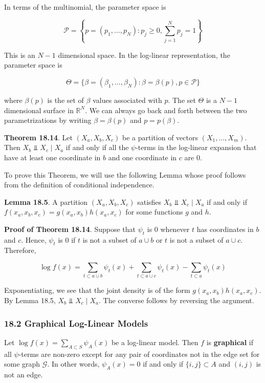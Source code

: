 In terms of the multinomial, the parameter space is

\[ \mathcal{P} = \left\{ p = (p_1, \dots, p_N) : p_j \geq 0, \sum_{j=1}^N p_j = 1 \right\} \]

This is an \(N - 1\) dimensional space. In the log-linear
representation, the parameter space is

\[ \Theta = \Bigg\{ \beta = (\beta_1, \dots, \beta_N) : \beta = \beta(p), p \in \mathcal{P} \Bigg\} \]

where \(\beta(p)\) is the set of \(\beta\) values associated with \(p\).
The set \(\Theta\) is a \(N - 1\) dimensional surface in
\(\mathbb{R}^N\). We can always go back and forth between the two
parametrizations by writing \(\beta = \beta(p)\) and \(p = p(\beta)\).

\textbf{Theorem 18.14}. Let \((X_a, X_b, X_c)\) be a partition of
vectors \((X_1, \dots, X_m)\). Then \(X_b \text{ ⫫ } X_c \; | \; X_a\)
if and only if all the \(\psi\)-terms in the log-linear expansion that
have at least one coordinate in \(b\) and one coordinate in \(c\) are 0.

To prove this Theorem, we will use the following Lemma whose proof
follows from the definition of conditional independence.

\textbf{Lemma 18.5}. A partition \((X_a, X_b, X_c)\) satisfies
\(X_b \text{ ⫫ } X_c \; | \; X_a\) if and only if
\(f(x_a, x_b, x_c) = g(x_a, x_b) h(x_a, x_c)\) for some functions \(g\)
and \(h\).

\textbf{Proof of Theorem 18.14}. Suppose that \(\psi_t\) is 0 whenever
\(t\) has coordinates in \(b\) and \(c\). Hence, \(\psi_t\) is 0 if
\(t\) is not a subset of \(a \cup b\) or \(t\) is not a subset of
\(a \cup c\). Therefore,

\[ \log f(x) = \sum_{t \subset a \cup b} \psi_t(x) + \sum_{t \subset a \cup c} \psi_t(x) - \sum_{t \subset a} \psi_t(x) \]

Exponentiating, we see that the joint density is of the form
\(g(x_a, x_b) h(x_a, x_c)\). By Lemma 18.5,
\(X_b \text{ ⫫ } X_c \; | \; X_a\). The converse follows by reversing
the argument.

\subsubsection{18.2 Graphical Log-Linear Models}\label{graphical-log-linear-models}

Let \(\log f(x) = \sum_{A \subset S} \psi_A(x)\) be a log-linear model.
Then \(f\) is \textbf{graphical} if all \(\psi\)-terms are non-zero
except for any pair of coordinates not in the edge set for some graph
\(\mathcal{G}\). In other words, \(\psi_A(x) = 0\) if and only if
\(\{i, j\} \subset A\) and \((i, j)\) is not an edge.

